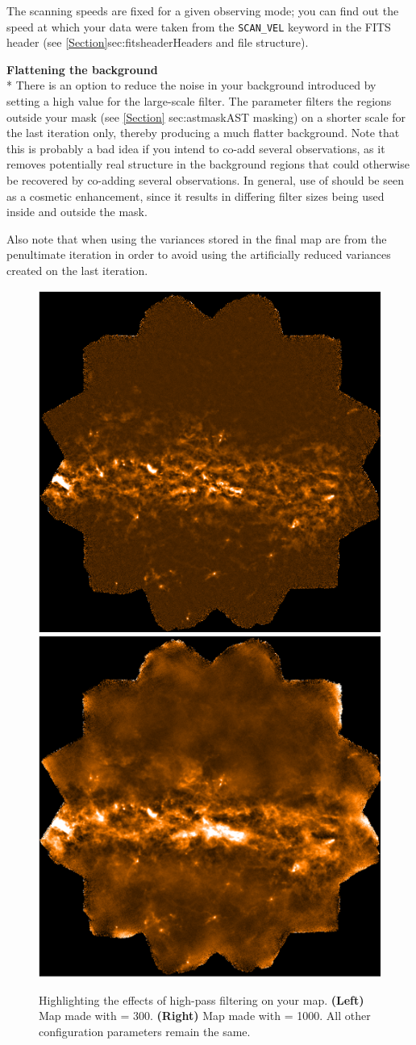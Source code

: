 The scanning speeds are fixed for a given observing mode; you can find
out the speed at which your data were taken from the
\texttt{SCAN\_VEL} keyword in the FITS header (see
\cref{Section}{sec:fitsheader}{Headers and file structure}).

\textbf{Flattening the background}\\*
There is an option to reduce the noise in your background introduced by
setting a high value for the large-scale filter. The parameter
filters the regions outside your  mask (see \cref{Section}
{sec:astmask}{AST masking}) on a shorter scale for the last iteration only,
thereby producing a much flatter background. Note that this is probably a
bad idea if you intend to co-add several observations, as it removes
potentially real structure in the background regions that could otherwise be
recovered by co-adding several observations. In general, use of
 should be seen as a cosmetic
enhancement, since it results in differing filter sizes being used inside
and outside the  mask.

Also note that when using  the
variances stored in the final map are from the penultimate iteration in
order to avoid using the artificially reduced variances created on the
last iteration.

\begin{figure}
\includegraphics[width=0.46\linewidth]{sc21_brex_19}
\hspace{7mm}
\includegraphics[width=0.46\linewidth]{sc21_brex_18}
\caption[Illustrating the effects of high-pass filtering]{
  Highlighting the effects of high-pass filtering on your map.
  \textbf{(Left)} Map made with  = 300.
  \textbf{(Right)} Map made with  = 1000.
  All other configuration parameters remain the same.\label{fig:fltcompare}
}
\end{figure}


